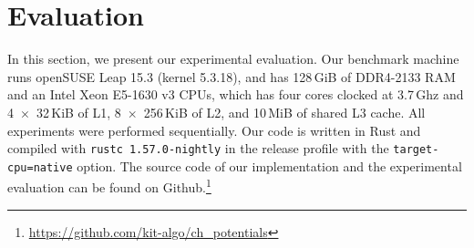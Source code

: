 \documentclass[manuscript,review]{acmart}
\begin{document}



\section{Evaluation}
\label{sec:experiments}

In this section, we present our experimental evaluation.
Our benchmark machine runs openSUSE Leap 15.3 (kernel 5.3.18), and has 128\,GiB of DDR4-2133 RAM and an Intel Xeon E5-1630 v3 CPUs, which has four cores clocked at 3.7\,Ghz and 4~$\times$~32\,KiB of L1, 8~$\times$~256\,KiB of L2, and 10\,MiB of shared L3 cache.
All experiments were performed sequentially.
Our code is written in Rust and compiled with \texttt{rustc 1.57.0-nightly} in the release profile with the \texttt{target-cpu=native} option.
The source code of our implementation and the experimental evaluation can be found on Github.\footnote{\url{https://github.com/kit-algo/ch_potentials}}
\end{document}

